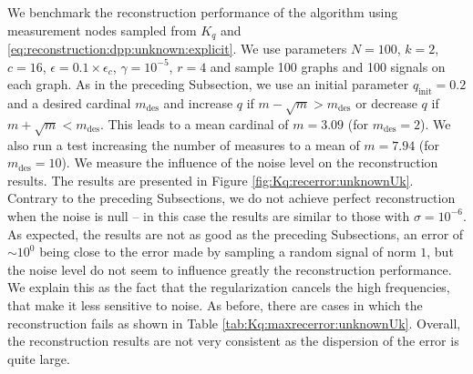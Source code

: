 \documentclass{article}
\begin{document}
We benchmark the reconstruction performance of the algorithm using measurement nodes sampled from $K_q$ and \eqref{eq:reconstruction:dpp:unknown:explicit}. We use parameters $N=100$, $k=2$, $c=16$, $\epsilon = 0.1 \times \epsilon_c$, $\gamma = 10^{-5}$, $r = 4$ and sample 100 graphs and 100 signals on each graph. As in the preceding Subsection, we use an initial parameter $q_\text{init} = 0.2$ and a desired cardinal $m_\text{des}$ and increase $q$ if $m - \sqrt{m} > m_\text{des}$ or decrease $q$ if $m + \sqrt{m} < m_\text{des}$. This leads to a mean cardinal of $m=3.09$ (for $m_\text{des} = 2$). We also run a test increasing the number of measures to a mean of $m=7.94$ (for $m_\text{des} = 10$). We measure the influence of the noise level on the reconstruction results. The results are presented in Figure \ref{fig:Kq:recerror:unknownUk}. Contrary to the preceding Subsections, we do not achieve perfect reconstruction when the noise is null -- in this case the results are similar to those with $\sigma = 10^{-6}$. As expected, the results are not as good as the preceding Subsections, an error of $\sim 10^0$ being close to the error made by sampling a random signal of norm $1$, but the noise level do not seem to influence greatly the reconstruction performance. We explain this as the fact that the regularization cancels the high frequencies, that make it less sensitive to noise. As before, there are cases in which the reconstruction fails as shown in Table \ref{tab:Kq:maxrecerror:unknownUk}. Overall, the reconstruction results are not very consistent as the dispersion of the error is quite large.
\end{document}
